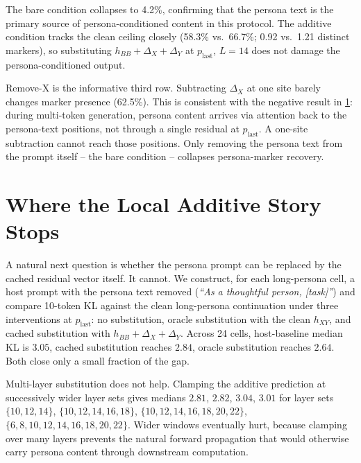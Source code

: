 \documentclass[11pt]{article}
\begin{document}
The bare condition collapses to 4.2\%, confirming that the persona text is the primary source of persona-conditioned content in this protocol. The additive condition tracks the clean ceiling closely (58.3\% vs.\ 66.7\%; 0.92 vs.\ 1.21 distinct markers), so substituting $h_{BB} + \Delta_X + \Delta_Y$ at $p_{\text{last}}$, $L=14$ does not damage the persona-conditioned output.

Remove-X is the informative third row. Subtracting $\Delta_X$ at one site barely changes marker presence (62.5\%). This is consistent with the negative result in \cref{sec:no-replacement}: during multi-token generation, persona content arrives via attention back to the persona-text positions, not through a single residual at $p_{\text{last}}$. A one-site subtraction cannot reach those positions. Only removing the persona text from the prompt itself -- the bare condition -- collapses persona-marker recovery.

\section{Where the Local Additive Story Stops}
\label{sec:no-replacement}

A natural next question is whether the persona prompt can be replaced by the cached residual vector itself. It cannot. We construct, for each long-persona cell, a host prompt with the persona text removed (\emph{``As a thoughtful person, [task]''}) and compare 10-token KL against the clean long-persona continuation under three interventions at $p_{\text{last}}$: no substitution, oracle substitution with the clean $h_{XY}$, and cached substitution with $h_{BB} + \Delta_X + \Delta_Y$. Across 24 cells, host-baseline median KL is $3.05$, cached substitution reaches $2.84$, oracle substitution reaches $2.64$. Both close only a small fraction of the gap.

Multi-layer substitution does not help. Clamping the additive prediction at successively wider layer sets gives medians $2.81$, $2.82$, $3.04$, $3.01$ for layer sets $\{10,12,14\}$, $\{10,12,14,16,18\}$, $\{10,12,14,16,18,20,22\}$, $\{6,8,10,12,14,16,18,20,22\}$. Wider windows eventually hurt, because clamping over many layers prevents the natural forward propagation that would otherwise carry persona content through downstream computation.
\end{document}
